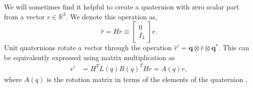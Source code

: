 \documentclass{svproc}
\newcommand{\R}{\mathbb{R}}
\newcommand{\q}{\textbf{q}}
\newcommand{\todo}[1]{\textcolor{red}{TODO: #1}}
\begin{document}
        We will sometimes find it helpful to create a quaternion with zero scalar part from a vector $r \in \R^3$. We denote this operation as,
        \begin{equation}
            \hat{r} = H r \equiv \begin{bmatrix} 0 \\ I_3 \end{bmatrix} r.
        \end{equation}
        Unit quaternions rotate a vector through the operation $\hat{r}' = \q \otimes \hat{r} \otimes \q^*$. This can be equivalently expressed using matrix multiplication as
        \begin{align} 
            r' &= H^T L(q) R(q)^T H r = A(q)r , \label{eq:quaternion_rotation} %
        \end{align}
        where $A(q)$ is the rotation matrix in terms of the elements of the quaternion \cite{markley2014fundamentals}. 
    

        
        
\end{document}
